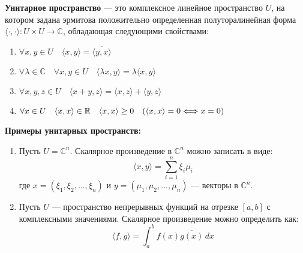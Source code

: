 \vspace{1cm}

\begin{shdef}
    \begin{definition}
        \leavevmode \newline
        
        \textbf{Унитарное пространство} — это комплексное линейное пространство $U$, на котором задана эрмитова положительно определенная полуторалинейная форма $\langle \cdot, \cdot \rangle: U \times U \to \mathbb{C}$, обладающая следующими свойствами:
    \begin{enumerate}
        \item $\forall x, y \in U \quad \langle x, y \rangle = \overline{\langle y, x \rangle}$
        \item $\forall \lambda \in \mathbb{C} \quad \forall x, y \in U \quad \langle \lambda x, y \rangle = \lambda \langle x, y \rangle$
        \item $\forall x, y, z \in U \quad \langle x + y, z \rangle = \langle x, z \rangle + \langle y, z \rangle$
        \item $\forall x \in U \quad \langle x,x \rangle \in \mathbb{R} \quad \langle x, x \rangle \geq 0 \quad (\langle x, x \rangle = 0 \Longleftrightarrow x = 0)$
    \end{enumerate}
    \vspace{0.3cm}
    \end{definition}
\end{shdef}


\vspace{1.0cm}
\textbf{Примеры унитарных пространств:}
\begin{shex}
    \begin{enumerate}
        \item Пусть \( U = \mathbb{C}^n \).
    Скалярное произведение в \(\mathbb{C}^n\) можно записать в виде:
    \[
    \langle x, y \rangle = \sum_{i=1}^n \xi_i \overline{\mu_i}
    \]
    где \( x = (\xi_1, \xi_2, \ldots, \xi_n) \) и \( y = (\mu_1, \mu_2, \ldots, \mu_n) \) — векторы в \(\mathbb{C}^n\).

\vspace{0.2cm}
        \item Пусть \( U \) — пространство непрерывных функций на отрезке \([a, b]\) с комплексными значениями.
    Скалярное произведение можно определить как:
    \[
    \langle f, g \rangle = \int_a^b f(x) \overline{g(x)} \, dx
    \]
    \end{enumerate}
\end{shex}


